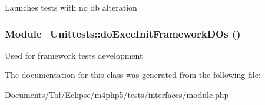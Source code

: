 Launches tests with no db alteration \hypertarget{classModule__Unittests_d5b0623b842be1ab385acbd44627dce1}{
\subsubsection[doExecInitFrameworkDOs]{\setlength{\rightskip}{0pt plus 5cm}Module\_\-Unittests::doExecInitFrameworkDOs ()}}
\label{classModule__Unittests_d5b0623b842be1ab385acbd44627dce1}


Used for framework tests development 

The documentation for this class was generated from the following file:\begin{CompactItemize}
\item 
Documents/Taf/Eclipse/m4php5/tests/interfaces/module.php\end{CompactItemize}
